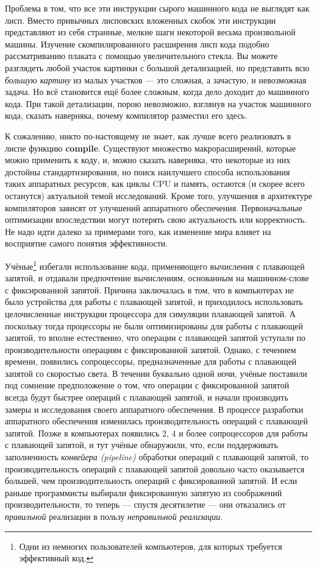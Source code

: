 Проблема в том, что все эти инструкции сырого машинного кода не выглядят как лисп. Вместо привычных лисповских вложенных скобок эти инструкции представляют из себя странные, мелкие шаги некоторой весьма произвольной машины. Изучение скомпилированного расширения лисп кода подобно рассматриванию плаката с помощью увеличительного стекла. Вы можете разглядеть любой участок картинки с большой детализацией, но представить всю \emph{большую картину} из малых участков --- это сложная, а зачастую, и невозможная задача. Но всё становится ещё более сложным, когда дело доходит до машинного кода. При такой детализации, порою невозможно, взглянув на участок машинного кода, сказать наверняка, почему компилятор разместил его здесь.

К сожалению, никто по-настоящему не знает, как лучше всего реализовать в лиспе функцию \textbf{compile}. Существуют множество макрорасширений, которые можно применить к коду, и, можно сказать наверняка, что некоторые из них достойны стандартизирования, но поиск наилучшего способа использования таких аппаратных ресурсов, как циклы CPU и память, остаются (и скорее всего останутся) актуальной темой исследований. Кроме того, улучшения в архитектуре компиляторов зависят от улучшений аппаратного обеспечения. Первоначальные оптимизации впоследствии могут потерять свою актуальность или корректность. Не надо идти далеко за примерами того, как изменение мира влияет на восприятие самого понятия эффективности.

Учёные\footnote{Одни из немногих пользователей компьютеров, для которых требуется эффективный код.} избегали использование кода, применяющего вычисления с плавающей запятой, и отдавали предпочтение вычислениям, основанным на машинном-слове с фиксированной запятой. Причина заключалась в том, что в компьютерах не было устройства для работы с плавающей запятой, и приходилось использовать целочисленные инструкции процессора для симуляции плавающей запятой. А поскольку тогда процессоры не были оптимизированы для работы с плавающей запятой, то вполне естественно, что операции с плавающей запятой уступали по производительности операциям с фиксированной запятой. Однако, с течением времени, появились сопроцессоры, предназначенные для работы с плавающей запятой со скоростью света. В течении буквально одной ночи, учёные поставили под сомнение предположение о том, что операции с фиксированной запятой всегда будут быстрее операций с плавающей запятой, и начали производить замеры и исследования своего аппаратного обеспечения. В процессе разработки аппаратного обеспечения изменилась производительность операций с плавающей запятой. Позже в компьютерах появились 2, 4 и более сопроцессоров для работы с плавающей запятой, и тут учёные обнаружили, что, если поддерживать заполненность \emph{конвейера (pipeline)} обработки операций с плавающей запятой, то производительность операций с плавающей запятой довольно часто оказывается большей, чем производительность операций с фиксированной запятой. И если раньше программисты выбирали фиксированную запятую из соображений производительности, то теперь --- спустя десятилетие --- они отказались от \emph{правильной} реализации в пользу \emph{неправильной реализации}.

